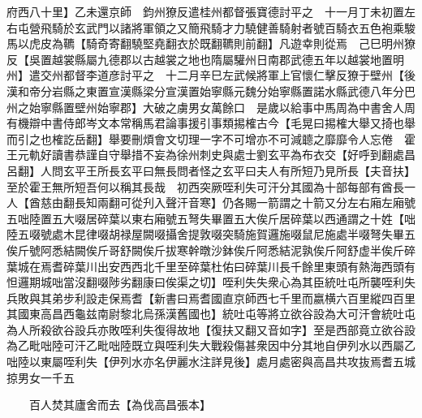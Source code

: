 府西八十里】乙未還京師　鈞州獠反遣桂州都督張寶德討平之　十一月丁未初置左右屯營飛騎於玄武門以諸將軍領之又簡飛騎才力驍健善騎射者號百騎衣五色袍乘駿馬以虎皮為韀【騎奇寄翻驍堅堯翻衣於既翻韀則前翻】凡遊幸則從焉　己巳明州獠反【吳置越裳縣屬九德郡以古越裳之地也隋屬驩州日南郡武德五年以越裳地置明州】遣交州都督李道彦討平之　十二月辛巳左武候將軍上官懷仁擊反獠于壁州【後漢和帝分岩縣之東置宣漢縣梁分宣漢置始寧縣元魏分始寧縣置諾水縣武德八年分巴州之始寧縣置壁州始寧郡】大破之虜男女萬餘口　是歲以給事中馬周為中書舍人周有機辯中書侍郎岑文本常稱馬君論事援引事類掦榷古今【毛晃曰掦榷大舉又掎也舉而引之也榷訖岳翻】舉要刪煩會文切理一字不可增亦不可減聼之靡靡令人忘倦　霍王元軌好讀書恭謹自守舉措不妄為徐州刺史與處士劉玄平為布衣交【好呼到翻處昌呂翻】人問玄平王所長玄平曰無長問者怪之玄平曰夫人有所短乃見所長【夫音扶】至於霍王無所短吾何以稱其長哉　初西突厥咥利失可汗分其國為十部每部有酋長一人【酋慈由翻長知兩翻可從刋入聲汗音寒】仍各賜一箭謂之十箭又分左右廂左廂號五咄陸置五大啜居碎葉以東右廂號五弩失畢置五大俟斤居碎葉以西通謂之十姓【咄陸五啜號處木昆律啜胡禄屋闕啜攝舍提敦啜突騎施賀邏施啜鼠尼施處半啜弩失畢五俟斤號阿悉結闕俟斤哥舒闕俟斤拔寒幹暾沙鉢俟斤阿悉結泥孰俟斤阿舒虚半俟斤碎葉城在焉耆碎葉川出安西西北千里至碎葉杜佑曰碎葉川長千餘里東頭有熱海西頭有怛邏期城咄當沒翻啜陟劣翻康曰俟渠之切】咥利失失衆心為其臣統吐屯所襲咥利失兵敗與其弟步利設走保焉耆【新書曰焉耆國直京師西七千里而嬴横六百里縱四百里其國東高昌西龜兹南尉黎北烏孫漢舊國也】統吐屯等將立欲谷設為大可汗會統吐屯為人所殺欲谷設兵亦敗咥利失復得故地【復扶又翻又音如字】至是西部竟立欲谷設為乙毗咄陸可汗乙毗咄陸既立與咥利失大戰殺傷甚衆因中分其地自伊列水以西屬乙咄陸以東屬咥利失【伊列水亦名伊麗水注詳見後】處月處密與高昌共攻抜焉耆五城掠男女一千五

　　百人焚其廬舍而去【為伐高昌張本】

